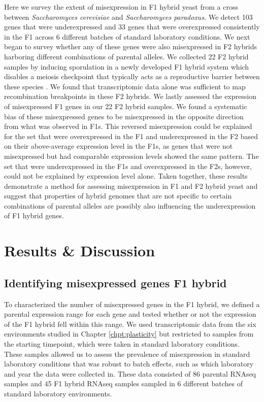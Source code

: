 
Here we survey the extent of misexpression in F1 hybrid yeast from a cross between \textit{Saccharomyces cerevisiae} and \textit{Saccharomyces paradoxus}. We detect 103 genes that were underexpressed and 33 genes that were overexpressed consistently in the F1 across 6 different batches of standard laboratory conditions. We next began to survey whether any of these genes were also misexpressed in F2 hybrids harboring different combinations of parental alleles. We collected 22 F2 hybrid samples by inducing sporulation in a newly developed F1 hybrid system which disables a meiosis checkpoint that typically acts as a reproductive barrier between these species \cite{Bozdag2021}. We found that transcriptomic data alone was sufficient to map recombination breakpoints in these F2 hybrids. We lastly assessed the expression of misexpressed F1 genes in our 22 F2 hybrid samples. We found a systematic bias of these misexpressed genes to be misexpressed in the opposite direction from what was observed in F1s. This reversed misexpression could be explained for the set that were overexpressed in the F1 and underexpressed in the F2 based on their above-average expression level in the F1s, as genes that were not misexpressed but had comparable expression levels showed the same pattern. The set that were underexpressed in the F1s and overexpressed in the F2s, however, could not be explained by expression level alone. Taken together, these results demonstrate a method for assessing misexpression in F1 and F2 hybrid yeast and suggest that properties of hybrid genomes that are not specific to certain combinations of parental alleles are possibly also influencing the underexpression of F1 hybrid genes.

\section{Results \& Discussion}

\subsection{Identifying misexpressed genes F1 hybrid}

To characterized the number of misexpressed genes in the F1 hybrid, we defined a parental expression range for each gene and tested whether or not the expression of the F1 hybrid fell within this range. We used transcriptomic data from the six environments studied in Chapter \ref{chpt:plasticity} but restricted to samples from the starting timepoint, which were taken in standard laboratory conditions. These samples allowed us to assess the prevalence of misexpression in standard laboratory conditions that was robust to batch effects, such as which laboratory and year the data were collected in. These data consisted of 86 parental RNAseq samples and 45 F1 hybrid RNAseq samples sampled in 6 different batches of standard laboratory environments.

